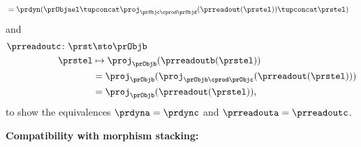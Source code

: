 \begin{example}
\begin{equation*}
\begin{aligned}
                                              & =\prdyn(\prObjael \tupconcat \proj_{\prObjc\cprod \prObjd}(\prreadout(\prstel)) \tupconcat \prstel)
        \end{aligned}
    \end{equation*}
    and
    \begin{equation*}
        \begin{aligned}
            \prreadoutc\colon \prst & \sto \prObjb \\
            \prstel                 & \mapsto
            \proj_\prObjb(\prreadoutb(\prstel)) \\
                                    & =\proj_\prObjb(\proj_{\prObjb\cprod \prObjc} (\prreadout(\prstel))) \\
                                    & =\proj_\prObjb(\prreadout(\prstel)),
        \end{aligned}
    \end{equation*}
    to show the equivalences $\prdyna=\prdync$ and $\prreadouta=\prreadoutc$.

    \textbf{Compatibility with morphism stacking:}


\end{example}
